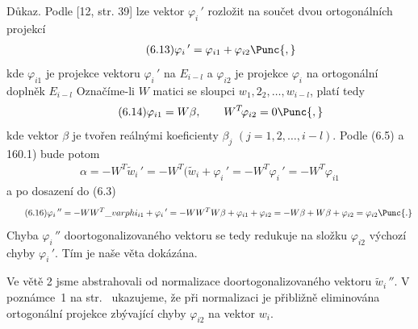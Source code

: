 Důkaz. Podle [12, str. 39] lze vektor $\varphi_i\,'$ rozložit na součet
dvou ortogonálních projekcí
%
\begin{align*}
  \tag{6.13}
  \varphi_i\,' = \varphi_{i1} + \varphi_{i2} \Punc{,}
\end{align*}
%
kde $\varphi_{i1}$ je projekce vektoru $\varphi_i\,'$
na $E_{i-l}$ a $\varphi_{i2}$ je projekce  $\varphi_i$
na ortogonální doplněk $E_{i-l}$ Označíme-li $W$ matici se sloupci
$w_1,2_2,\dots,w_{i-l}$, platí tedy
%
\begin{align*}
  \tag{6.14}
  \varphi_{i1} = W\beta, \qquad W^T\!\varphi_{i2} = 0 \Punc{,}
\end{align*}
%
kde  vektor $\beta$ je tvořen reálnými koeficienty $\beta_j$
$(j=1,2,\dots,i-l)$.  Podle (6.5) a 160.1) bude potom
%
\begin{align*}
  \tag{6.15}
  \alpha = - W^T\widetilde w_i\,'
  = -W^T(\widetilde w_i + \varphi_i\,'
  = -W^T\varphi_i\,' = -W^T\varphi_{i1}
\end{align*}
%
a po dosazení do (6.3)
%
\begin{align*}
  \tag{6.16}
  \varphi_i\,'' = -WW^T \_varphi_{i1} + \varphi_i\,'
  = - WW^TW\beta + \varphi_{i1} + \varphi_{i2}
  = -W\beta + W\beta + \varphi_{i2} = \varphi_{i2} \Punc{.}
\end{align*}
%
Chyba $\varphi_i\,''$ doortogonalizovaného vektoru se tedy redukuje na
složku $\varphi_{i2}$ výchozí chyby $\varphi_i\,'$. Tím je naše věta
dokázána.

Ve větě 2 jsme abstrahovali od normalizace doortogonalizovaného
vektoru $\widetilde w_i\,''$.  V poznámce~1 na str.~\label{LX}
ukazujeme, že při normalizaci je přibližně eliminována ortogonální
projekce zbývající chyby $\varphi_{i2}$ na vektor $w_i$.





